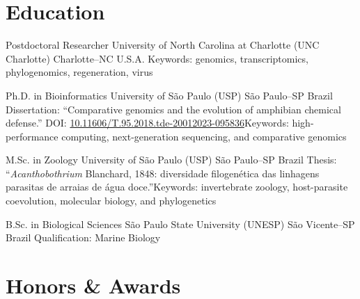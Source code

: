 \documentclass[11pt, letterpaper, sans]{moderncv}
\begin{document}


\restoregeometry

\clearpage


\section{Education}

		{Postdoctoral Researcher}
		{University of North Carolina at Charlotte (UNC Charlotte)}
		{Charlotte--NC}
		{U.S.A.}
		{Keywords: genomics, transcriptomics, phylogenomics, regeneration, virus}
	
		{Ph.D. in Bioinformatics}
		{University of São Paulo (USP)}
		{São Paulo--SP}
		{Brazil}
		{Dissertation: ``Comparative genomics and the evolution of amphibian chemical defense.'' DOI: \href{https://doi.org/10.11606/T.95.2018.tde-20012023-095836}{10.11606/T.95.2018.tde-20012023-095836}\newline{}Keywords: high-performance computing, next-generation sequencing, and comparative genomics}

		{M.Sc. in Zoology}
		{University of São Paulo (USP)}
		{São Paulo--SP}
		{Brazil}
		{Thesis: ``\textit{Acanthobothrium} Blanchard, 1848: diversidade filogenética das linhagens parasitas de arraias de água doce.''\newline{}Keywords: invertebrate zoology, host-parasite coevolution, molecular biology, and phylogenetics}

		{B.Sc. in Biological Sciences}
		{São Paulo State University (UNESP)}
		{São Vicente--SP}
		{Brazil}
		{Qualification: Marine Biology}


\section{Honors \& Awards}
\end{document}
